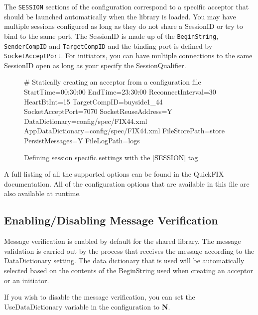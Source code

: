 The \verb|SESSION| sections of the configuration correspond to a specific acceptor that should be 
launched automatically when the library is loaded. You may have multiple sessions configured as long
as they do not share a SessionID or try to bind to the same port. The SessionID is made up of the \verb|BeginString|, \verb|SenderCompID| and \verb|TargetCompID| and the binding port is defined by
\verb|SocketAcceptPort|. For initiators, you can have multiple connections to the same SessionID open as long as your specify the SessionQualifier. 

\begin{figure}[H]
\begin{inicode}
[SESSION]
# Statically creating an acceptor from a configuration file
StartTime=00:30:00
EndTime=23:30:00
ReconnectInterval=30
HeartBtInt=15
TargetCompID=buyside1_44
SocketAcceptPort=7070
SocketReuseAddress=Y
DataDictionary=config/spec/FIX44.xml
AppDataDictionary=config/spec/FIX44.xml
FileStorePath=store
PersistMessages=Y
FileLogPath=logs
\end{inicode}
\caption{Defining session specific settings with the [SESSION] tag}
\end{figure}

A full listing of all the supported options can be found in the QuickFIX documentation. All of the configuration options that are available in this file are also available at runtime.

\subsection{Enabling/Disabling Message Verification}

Message verification is enabled by default for the shared library. The message validation is carried out by the process that receives the message according to the DataDictionary setting. The data dictionary that is used will be automatically selected based on the contents of the BeginString
used when creating an acceptor or an initiator.

If you wish to disable the message verification, you can set the UseDataDictionary variable in the
configuration to \textbf{N}.

